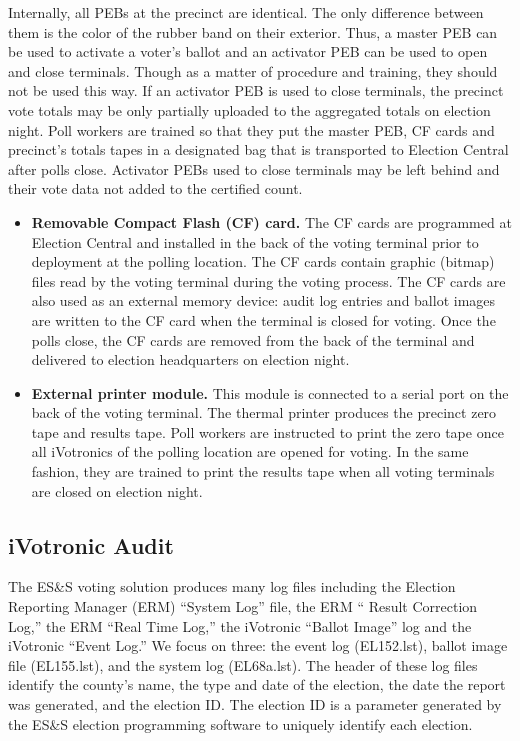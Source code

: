Internally, all PEBs at the precinct are identical. The only
difference between them is the color of the rubber band on their
exterior. Thus, a master PEB can be used to activate a voter's ballot
and an activator PEB can be used to open and close terminals. Though
as a matter of procedure and training, they should not be used this
way. If an activator PEB is used to close terminals, the precinct vote
totals may be only partially uploaded to the aggregated totals on
election night. Poll workers are trained so that they put the master
PEB, CF cards and precinct's totals tapes in a designated bag that is
transported to Election Central after polls close.  Activator PEBs
used to close terminals may be left behind and their vote data not
added to the certified count.
\begin{itemize}
\item \textbf{Removable Compact Flash (CF) card.} The CF cards are
  programmed at Election Central and installed in the back of the
  voting terminal prior to deployment at the polling location. The CF
  cards contain graphic (bitmap) files read by the voting terminal
  during the voting process. The CF cards are also used as an external
  memory device: audit log entries and ballot images are written to
  the CF card when the terminal is closed for voting. Once the polls
  close, the CF cards are removed from the back of the terminal and
  delivered to election headquarters on election night.  

\item \textbf{External printer module.} This module is connected to a
  serial port on the back of the voting terminal. The thermal printer
  produces the precinct zero tape and results tape. Poll workers are
  instructed to print the zero tape once all iVotronics of the polling
  location are opened for voting. In the same fashion, they are
  trained to print the results tape when all voting terminals are
  closed on election night. 
\end{itemize}

\subsection{iVotronic Audit}
The ES\&S voting solution produces many log files including the
Election Reporting Manager (ERM) \textquotedblleft System
Log\textquotedblright \hspace{1 mm} file, the ERM \textquotedblleft
Result Correction Log,\textquotedblright \hspace{1 mm} the ERM
\textquotedblleft Real Time Log,\textquotedblright \hspace{1 mm} the
iVotronic \textquotedblleft Ballot Image\textquotedblright \hspace{1
  mm} log and the iVotronic \textquotedblleft Event
Log.\textquotedblright \hspace{2 mm} We focus on three: the event log
(EL152.lst), ballot image file (EL155.lst), and the system log
(EL68a.lst).  The header of these log files identify the county's
name, the type and date of the election, the date the report was
generated, and the election ID. The election ID is a parameter
generated by the ES\&S election programming software to uniquely
identify each election.  
 
